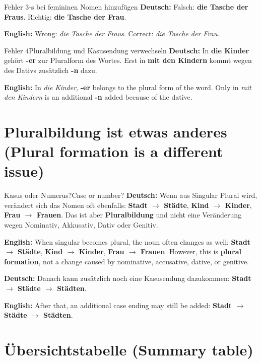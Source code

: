 \documentclass[a4paper,11pt]{article}
\newcommand{\GermanText}[1]{\textbf{Deutsch: }#1\par}
\newcommand{\EnglishText}[1]{{\small\color{SoftGray}\textbf{English: }#1\par}}
\begin{document}
\begin{grammarentry}{Fehler 3}{-s bei femininen Nomen hinzufügen}
\GermanText{Falsch: \textbf{die Tasche der Fraus}. Richtig: \textbf{die Tasche der Frau}.}
\EnglishText{Wrong: \emph{die Tasche der Fraus}. Correct: \emph{die Tasche der Frau}.}
\end{grammarentry}

\begin{grammarentry}{Fehler 4}{Pluralbildung und Kasusendung verwechseln}
\GermanText{In \textbf{die Kinder} gehört \textbf{-er} zur Pluralform des Wortes. Erst in \textbf{mit den Kindern} kommt wegen des Dativs zusätzlich \textbf{-n} dazu.}
\EnglishText{In \emph{die Kinder}, \textbf{-er} belongs to the plural form of the word. Only in \emph{mit den Kindern} is an additional \textbf{-n} added because of the dative.}
\end{grammarentry}

\section{Pluralbildung ist etwas anderes \textnormal{(Plural formation is a different issue)}}

\begin{grammarentry}{Kasus oder Numerus?}{Case or number?}
\GermanText{Wenn aus Singular Plural wird, verändert sich das Nomen oft ebenfalls: \textbf{Stadt $\rightarrow$ Städte}, \textbf{Kind $\rightarrow$ Kinder}, \textbf{Frau $\rightarrow$ Frauen}. Das ist aber \textbf{Pluralbildung} und nicht eine Veränderung wegen Nominativ, Akkusativ, Dativ oder Genitiv.}
\EnglishText{When singular becomes plural, the noun often changes as well: \textbf{Stadt $\rightarrow$ Städte}, \textbf{Kind $\rightarrow$ Kinder}, \textbf{Frau $\rightarrow$ Frauen}. However, this is \textbf{plural formation}, not a change caused by nominative, accusative, dative, or genitive.}

\GermanText{Danach kann zusätzlich noch eine Kasusendung dazukommen: \textbf{Stadt $\rightarrow$ Städte $\rightarrow$ Städten}.}
\EnglishText{After that, an additional case ending may still be added: \textbf{Stadt $\rightarrow$ Städte $\rightarrow$ Städten}.}
\end{grammarentry}

\section{Übersichtstabelle \textnormal{(Summary table)}}
\end{document}
